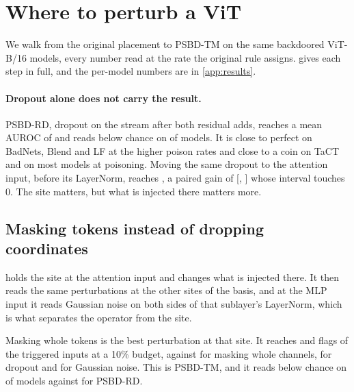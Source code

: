 \section{Where to perturb a ViT}
\label{sec:results}

We walk from the original placement to PSBD-TM on the same backdoored ViT-B/16 models, every number read at the rate the original rule assigns.  gives each step in full, and the per-model numbers are in \cref{app:results}.

\paragraph{Dropout alone does not carry the result.}
PSBD-RD, dropout on the stream after both residual adds, reaches a mean AUROC of \StaircaseResidualPostResidualAuroc{} and reads below chance on \StaircaseResidualPostResidualBelowChance{} of \StaircaseResidualPostResidualN{} models. It is close to perfect on BadNets, Blend and LF at the higher poison rates and close to a coin on TaCT and on most models at \PanelRateLow{} poisoning. Moving the same dropout to the attention input, before its LayerNorm, reaches \StaircaseDropoutSitesBeforeAttentionNormAuroc{}, a paired gain of \StaircaseDropoutSitesBeforeAttentionNormGain{} [\StaircaseDropoutSitesBeforeAttentionNormGainLow{}, \StaircaseDropoutSitesBeforeAttentionNormGainHigh{}] whose interval touches 0. The site matters, but what is injected there matters more.

\subsection{Masking tokens instead of dropping coordinates}
\label{sec:results:operator}

 holds the site at the attention input and changes what is injected there. It then reads the same perturbations at the other sites of the basis, and at the MLP input it reads Gaussian noise on both sides of that sublayer's LayerNorm, which is what separates the operator from the site.



Masking whole tokens is the best perturbation at that site. It reaches \StaircaseOperatorsBeforeAttentionNormTokenMaskAuroc{} and flags \StaircaseOperatorsBeforeAttentionNormTokenMaskTprAtOneZeroPercent{} of the triggered inputs at a 10\% budget, against \StaircaseOperatorsBeforeAttentionNormChannelMaskAuroc{} for masking whole channels, \StaircaseOperatorsBeforeAttentionNormAuroc{} for dropout and \StaircaseOperatorsBeforeAttentionNormGaussianAuroc{} for Gaussian noise. This is PSBD-TM, and it reads below chance on \StaircaseOperatorsBeforeAttentionNormTokenMaskBelowChance{} of \StaircaseOperatorsBeforeAttentionNormTokenMaskN{} models against \StaircaseOperatorsPostResidualBelowChance{} for PSBD-RD.

